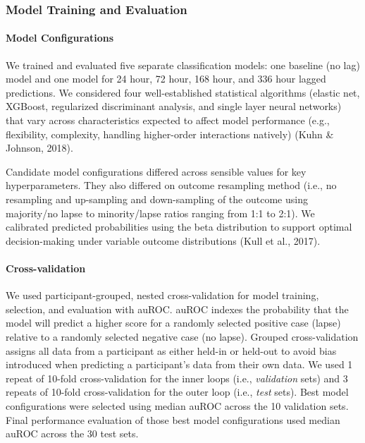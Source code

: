\documentclass[
]{agujournal2019}
\let\oldparagraph\paragraph
\renewcommand{\paragraph}[1]{\oldparagraph{#1}\mbox{}}
\begin{document}
\subsubsection{Model Training and
Evaluation}\label{model-training-and-evaluation}

\paragraph{Model Configurations}\label{model-configurations}

We trained and evaluated five separate classification models: one
baseline (no lag) model and one model for 24 hour, 72 hour, 168 hour,
and 336 hour lagged predictions. We considered four well-established
statistical algorithms (elastic net, XGBoost, regularized discriminant
analysis, and single layer neural networks) that vary across
characteristics expected to affect model performance (e.g., flexibility,
complexity, handling higher-order interactions natively) (Kuhn \&
Johnson, 2018).

Candidate model configurations differed across sensible values for key
hyperparameters. They also differed on outcome resampling method (i.e.,
no resampling and up-sampling and down-sampling of the outcome using
majority/no lapse to minority/lapse ratios ranging from 1:1 to 2:1). We
calibrated predicted probabilities using the beta distribution to
support optimal decision-making under variable outcome distributions
(Kull et al., 2017).

\paragraph{Cross-validation}\label{cross-validation}

We used participant-grouped, nested cross-validation for model training,
selection, and evaluation with auROC. auROC indexes the probability that
the model will predict a higher score for a randomly selected positive
case (lapse) relative to a randomly selected negative case (no lapse).
Grouped cross-validation assigns all data from a participant as either
held-in or held-out to avoid bias introduced when predicting a
participant's data from their own data. We used 1 repeat of 10-fold
cross-validation for the inner loops (i.e., \emph{validation} sets) and
3 repeats of 10-fold cross-validation for the outer loop (i.e.,
\emph{test} sets). Best model configurations were selected using median
auROC across the 10 validation sets. Final performance evaluation of
those best model configurations used median auROC across the 30 test
sets.
\end{document}
